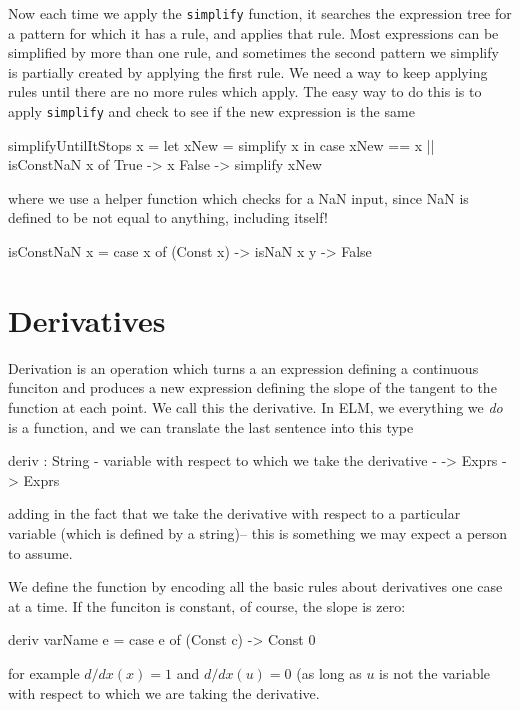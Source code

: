 \documentclass[12pt]{amsbook}
\begin{document}
Now each time we apply the \verb|simplify| function, it searches the 
expression tree for a pattern for which it has a rule, and applies 
that rule.  
Most expressions can be simplified by more than one rule,
and sometimes the second pattern we simplify is partially created by applying the first rule.
We need a way to keep applying rules until there are no more rules which apply.
The easy way to do this is to apply \verb|simplify| and
check to see if the new expression is the same
\begin{code}
simplifyUntilItStops x = let xNew = simplify x
                         in case xNew == x || isConstNaN x of
                              True  -> x
                              False -> simplify xNew
\end{code}
where we use a helper function which checks for a NaN input,
since NaN is defined to be not equal to anything, including itself!
\vspace{-12pt}
\begin{code}
isConstNaN x = case x of
                 (Const x) -> isNaN x
                 y         -> False
\end{code}

\section{Derivatives}

Derivation is an operation which turns a an expression defining a continuous funciton and produces a new expression defining the slope of the tangent to the function at each point.
We call this the derivative.
In ELM, we everything we \emph{do} is a function, and we can translate the last sentence into this type
\vspace{-12pt}
\begin{code}
deriv : String {- variable with respect to which we take the derivative -}
      -> Exprs 
      -> Exprs
\end{code}
adding in the fact that we take the derivative with respect to a particular variable (which is defined by a string)--%
this is something we may expect a person to assume.

We define the function by encoding all the basic rules about derivatives one case at a time.
If the funciton is constant, of course, the slope is zero:
\vspace{-12pt}
\begin{code}
deriv varName e
  = case e of
      (Const c) -> Const 0
\end{code}
for example
$d/dx (x) = 1$ and   $d/dx (u) = 0$ (as long as $u$ is not the variable with respect to which we are taking the derivative.
\end{document}
